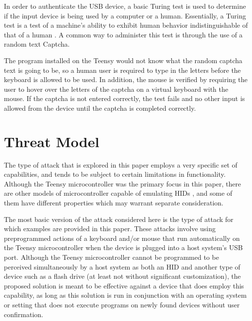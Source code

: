 \documentclass[pagenumbers]{ieee}
\begin{document}
In order to authenticate the USB device, a basic Turing test is used to determine if the input device is being used by a computer or a human. Essentially, a Turing test is a test of a machine's ability to exhibit human behavior indistinguishable of that of a human \cite{turing}. A common way to administer this test is through the use of a random text Captcha. 

The program installed on the Teensy would not know what the random captcha text is going to be, so a human user is required to type in the letters before the keyboard is allowed to be used. In addition, the mouse is verified by requiring the user to hover over the letters of the captcha on a virtual keyboard with the mouse. If the captcha is not entered correctly, the test fails and no other input is allowed from the device until the captcha is completed correctly.


\section{Threat Model}
\label{section:threat}

The type of attack that is explored in this paper employs a very specific set of capabilities, and tends to be subject to certain limitations in functionality. Although the Teensy microcontroller was the primary focus in this paper, there are other models of microcontroller capable of emulating HIDs  \cite{captcha}, and some of them have different properties which may warrant separate consideration. 

The most basic version of the attack considered here is the type of attack for which examples are provided in this paper. These attacks involve using preprogrammed actions of a keyboard and/or mouse that run automatically on the Teensy microcontroller when the device is plugged into a host system's USB port. Although the Teensy microcontroller cannot be programmed to be perceived simultaneously by a host system as both an HID and another type of device such as a flash drive (at least not without significant customization), the proposed solution is meant to be effective against a device that does employ this capability, as long as this solution is run in conjunction with an operating system or setting that does not execute programs on newly found devices without user confirmation.
\end{document}
